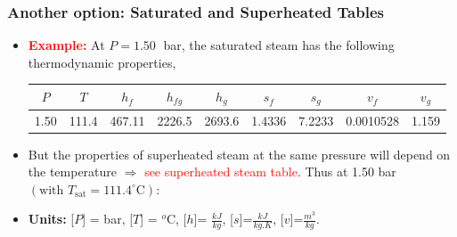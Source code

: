 \documentclass[10pt,compress,handout,ignorenonframetext]{beamer}
\begin{document}
\begin{frame}
  \frametitle{Another option: Saturated and Superheated Tables}
\noindent
\begin{itemize}
\item <1-> {\bf \textcolor{red}{Example:}} At $P=1.50\;$ bar, the saturated steam has the following thermodynamic properties,
\tiny 
\begin{center}
\begin{tabular}{c c|c c c|c c|c c} 
$P$ & $T$ & $h_{f}$ &  $h_{fg}$ & $h_{g}$ & $s_{f}$ &  $s_{g}$ & $v_{f}$ & $v_{g}$ \\ 
\hline
1.50 & 111.4 & 467.11 & 2226.5 & 2693.6 & 1.4336 & 7.2233 & 0.0010528 & 1.159 \\
\end{tabular}
\end{center}

\item <3-> But the properties of superheated steam at the same pressure will depend on the temperature $\Rightarrow$ \textcolor{red}{see superheated steam table}. Thus at 1.50 bar $\left(\text{with }T_{\text{sat}}=111.4^{\circ}\text{C}\right)$:
\item <2-> {\bf Units:} [$P$] = bar, [$T$] = $^{o}$C, [$h$]= $\frac{kJ}{kg}$, [$s$]=$\frac{kJ}{kg.K}$, [$v$]=$\frac{m^{3}}{kg}$.

\end{itemize}

\end{frame}
\end{document}
